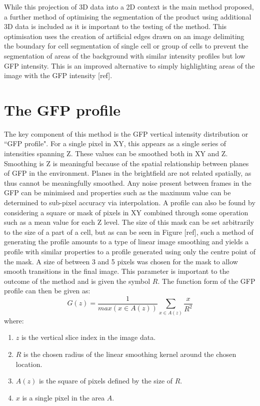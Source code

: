 While this projection of 3D data into a 2D context is the main method proposed, a further method of optimising the segmentation of the product using additional 3D data is included as it is important to the testing of the method. This optimisation uses the creation of artificial edges drawn on an image delimiting the boundary for cell segmentation of single cell or group of cells to prevent the segmentation of areas of the background with similar intensity profiles but low GFP intensity. This is an improved alternative to simply highlighting areas of the image with the GFP intensity [ref].

\section{The GFP profile}

The key component of this method is the GFP vertical intensity distribution or ``GFP profile". For a single pixel in XY, this appears as a single series of intensities spanning Z. These values can be smoothed both in XY and Z. Smoothing is Z is meaningful because of the spatial relationship between planes of GFP in the environment. Planes in the brightfield are not related spatially, as thus cannot be meaningfully smoothed. Any noise present between frames in the GFP can be minimised and properties such as the maximum value can be determined to sub-pixel accuracy via interpolation. A profile can also be found by considering a square or mask of pixels in XY combined through some operation such as a mean value for each Z level. The size of this mask can be set arbitrarily to the size of a part of a cell, but as can be seen in Figure [ref], such a method of generating the profile amounts to a type of linear image smoothing and yields a profile with similar properties to a profile generated using only the centre point of the mask. A size of between 3 and 5 pixels was chosen for the mask to allow smooth transitions in the final image. This parameter is important to the outcome of the method and is given the symbol $R$. The function form of the GFP profile can then be given as:
$$ G(z) = \frac{1}{max(x \in A(z))}\sum_{x \in A(z)} \frac{x}{R^2} $$
where:
\begin{enumerate}
	\item $z$ is the vertical slice index in the image data.
	\item $R$ is the chosen radius of the linear smoothing kernel around the chosen location.
	\item $A(z)$ is the square of pixels defined by the size of $R$.
	\item $x$ is a single pixel in the area $A$.
\end{enumerate}


